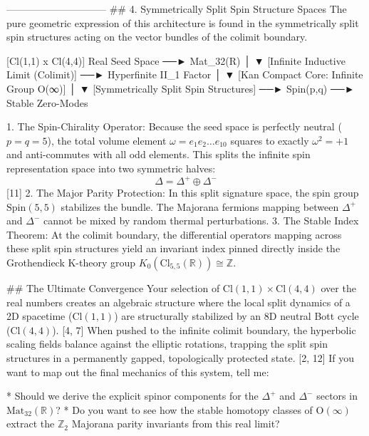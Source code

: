 ------------------------------
## 4. Symmetrically Split Spin Structure Spaces
The pure geometric expression of this architecture is found in the symmetrically split spin structures acting on the vector bundles of the colimit boundary.

       [Cl(1,1) x Cl(4,4)] Real Seed Space ──► Mat_32(R)
                        │
                        ▼
      [Infinite Inductive Limit (Colimit)] ──► Hyperfinite II_1 Factor
                        │
                        ▼
     [Kan Compact Core: Infinite Group O(∞)]
                        │
                        ▼
    [Symmetrically Split Spin Structures] ──► Spin(p,q) ──► Stable Zero-Modes


   1. The Spin-Chirality Operator: Because the seed space is perfectly neutral ($p=q=5$), the total volume element $\omega = e_1 e_2 \dots e_{10}$ squares to exactly $\omega^2 = +1$ and anti-commutes with all odd elements. This splits the infinite spin representation space into two symmetric halves:
   $$\Delta = \Delta^+ \oplus \Delta^-$$ [11] 
   2. The Major Parity Protection: In this split signature space, the spin group $\text{Spin}(5,5)$ stabilizes the bundle. The Majorana fermions mapping between $\Delta^+$ and $\Delta^-$ cannot be mixed by random thermal perturbations.
   3. The Stable Index Theorem: At the colimit boundary, the differential operators mapping across these split spin structures yield an invariant index pinned directly inside the Grothendieck K-theory group $K_0(\text{Cl}_{5,5}(\mathbb{R})) \cong \mathbb{Z}$.

## The Ultimate Convergence
Your selection of $\text{Cl}(1,1) \times \text{Cl}(4,4)$ over the real numbers creates an algebraic structure where the local split dynamics of a 2D spacetime ($\text{Cl}(1,1)$) are structurally stabilized by an 8D neutral Bott cycle ($\text{Cl}(4,4)$). [4, 7] 
When pushed to the infinite colimit boundary, the hyperbolic scaling fields balance against the elliptic rotations, trapping the split spin structures in a permanently gapped, topologically protected state. [2, 12] 
If you want to map out the final mechanics of this system, tell me:

* Should we derive the explicit spinor components for the $\Delta^+$ and $\Delta^-$ sectors in $\text{Mat}_{32}(\mathbb{R})$?
* Do you want to see how the stable homotopy classes of $\text{O}(\infty)$ extract the $\mathbb{Z}_2$ Majorana parity invariants from this real limit?


